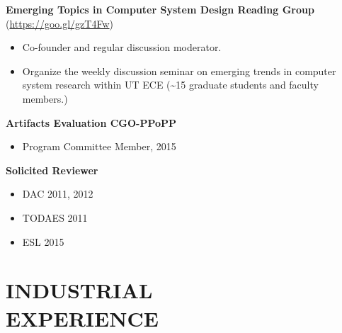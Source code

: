 \documentclass[margin, 9pt]{res} %
\begin{document}
\begin{resume}
\medskip
\textbf{Emerging Topics in Computer System Design Reading Group} (\url{https://goo.gl/gzT4Fw})\\
\vspace*{-10pt}
\begin{itemize}[leftmargin=*] \itemsep -3pt
\vspace*{-5pt}
	\item Co-founder and regular discussion moderator. \par
	\item Organize the weekly discussion seminar on emerging trends in computer system research within UT ECE (\textasciitilde 15 graduate students and faculty members.) \par
\end{itemize}

\medskip
\textbf{Artifacts Evaluation CGO-PPoPP}\\
\vspace*{-10pt}
\begin{itemize}[leftmargin=*] \itemsep -3pt
\vspace*{-5pt}
	\item Program Committee Member, 2015\par
\end{itemize}

\medskip
\textbf{Solicited Reviewer}\\
\vspace*{-10pt}
\begin{itemize}[leftmargin=*] \itemsep -3pt
\vspace*{-5pt}
	\item DAC 2011, 2012\par
	\item TODAES 2011\par
    \item ESL 2015\par
\end{itemize}


\section{INDUSTRIAL\\ EXPERIENCE} 


\end{resume}
\end{document}
